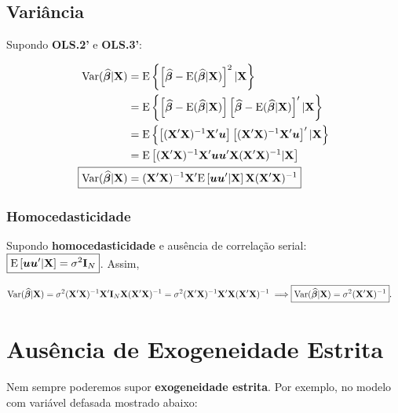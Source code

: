 \documentclass[11pt, oneside, a4paper, article]{article}
\numberwithin{equation}{section}
\begin{document}
\subsection{Variância} 
Supondo \textbf{OLS.2'} e \textbf{OLS.3'}:

\vspace{-1 em}
\begin{align*} 
	\Var ( \widehat{\betavec} | \Xmat) 
	&= \E \left\{\left[ 
			\widehat{\betavec} - \E ( \widehat{\betavec} | \Xmat )
	\right]^2 | \Xmat \right\}
	\\
	&= \E \left\{ 
		\left[ \widehat{\betavec} - \E ( \widehat{\betavec} | \Xmat ) \right]
		\left[ \widehat{\betavec} - \E ( \widehat{\betavec} | \Xmat ) \right]'
	| \Xmat \right\}
	\\
	&= \E \left\{ 
		\left[ (\Xmat'\Xmat)^{-1}\Xmat' \uvec \right]
		\left[ (\Xmat'\Xmat)^{-1}\Xmat' \uvec \right]'
	| \Xmat \right\}
	\\
	&= \E \left[ (\Xmat'\Xmat)^{-1}\Xmat' \uvec \uvec' \Xmat (\Xmat'\Xmat)^{-1} | \Xmat \right]
	\\
	\Aboxed{
		\Var ( \widehat{\betavec} | \Xmat) 
		&= 
		(\Xmat'\Xmat)^{-1}\Xmat' 
		\E \left[ \uvec \uvec'| \Xmat \right]
	\Xmat (\Xmat'\Xmat)^{-1} }
\end{align*}

\subsubsection{Homocedasticidade}
Supondo \textbf{homocedasticidade} e ausência de correlação serial: 
$\boxed{ \text{E} \left[ \boldsymbol{u} \boldsymbol{u}'| \mathbf{X} \right] = \sigma^2 \mathbf{I}_{N} }$.
Assim, 

\vspace{-1 em}
\begin{align*} 
	\Var ( \widehat{\betavec} | \Xmat) 
	= \sigma^2 (\Xmat'\Xmat)^{-1}\Xmat' \Imat_{N} \Xmat (\Xmat'\Xmat)^{-1}
	= \sigma^2 (\Xmat'\Xmat)^{-1}\Xmat'\Xmat (\Xmat'\Xmat)^{-1}
	\implies
	\Aboxed{ \Var ( \widehat{\betavec} | \Xmat) &= \sigma^2 (\Xmat'\Xmat)^{-1} }.
\end{align*}

\clearpage
\section{Ausência de Exogeneidade Estrita}
Nem sempre poderemos supor \textbf{exogeneidade estrita}.
Por exemplo, no modelo com variável defasada mostrado abaixo:
\end{document}
